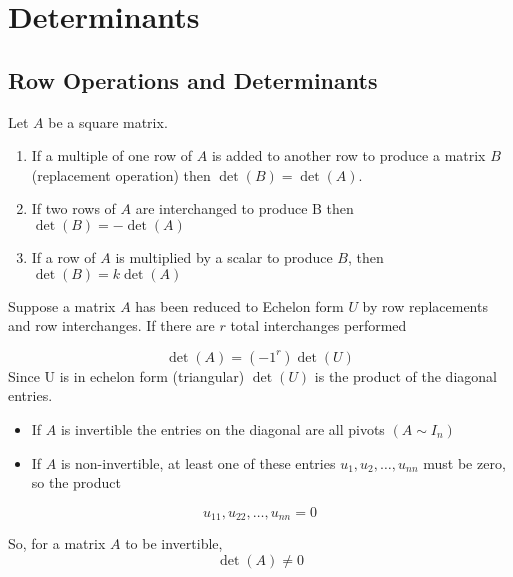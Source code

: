 \section {Determinants}



\subsection{Row Operations and Determinants}

Let $A$ be a square matrix. 

\begin{enumerate}
	\item If a multiple of one row of $A$ is added to another row to produce a matrix $B$ (replacement operation) then $\det(B)=\det(A)$.
	
	\item If two rows of $A$ are interchanged to produce B then $\det(B)=-\det(A)$

	\item If a row of $A$ is multiplied by a scalar to produce $B$, then $\det(B)=k\det(A)$
\end{enumerate}

Suppose a matrix $A$ has been reduced to Echelon form $U$ by row replacements and row interchanges.
If there are $ r $  total interchanges performed

\begin{equation}
	\det(A) = (-1^{r}) \det(U)
\end{equation}
Since U is in echelon form (triangular) $\det(U)$ is the product of the diagonal entries.

\hfill
\hfill
\begin{itemize}  
  \item   If $A$ is invertible the entries on the diagonal are all pivots $(A \sim I_{n})$

  \item If $A$ is non-invertible, at least one of these entries $u_{1},u_{2},\ldots,u_{nn}$ must be zero, so the product
\end{itemize}

\begin{equation}
	u_{11},u_{22},\ldots,u_{nn} = 0
\end{equation}

So, for a matrix $A$ to be invertible,
\begin{equation}
	\label{}
	\det(A)\neq 0
\end{equation}

